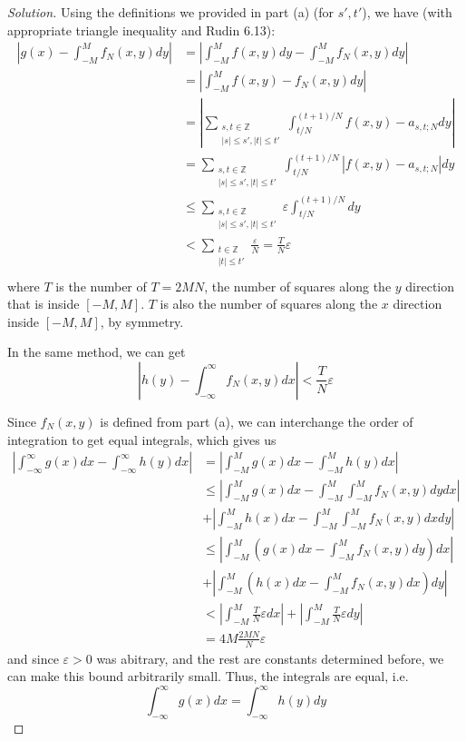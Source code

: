 \documentclass{article}
\newcommand{\Z}{{\mathbb Z}}
\newcommand{\ep}{{\varepsilon}}
\theoremstyle{remark}
\begin{document}
\begin{enumerate}
\begin{proof}[Solution]
		Using the definitions we provided in part (a) (for $s',t'$), we have
		(with appropriate triangle inequality and Rudin 6.13):
		\begin{align*}
			\left\lvert g(x) - \int_{-M}^M f_N(x,y)dy \right\rvert
			&= \left\lvert \int_{-M}^M f(x,y)dy - \int_{-M}^M f_N(x,y)dy \right\rvert\\
			&= \left\lvert \int_{-M}^M f(x,y) - f_N(x,y)dy \right\rvert\\
			&= \left\lvert
				\sum_{{\substack{s,t\in\Z\\|s|\leq s',|t|\leq t'}}} 
				\int_{t/N}^{(t+1)/N} f(x,y) - a_{s,t;N}dy
				\right\rvert\\
			&= \sum_{{\substack{s,t\in\Z\\|s|\leq s',|t|\leq t'}}}
			\int_{t/N}^{(t+1)/N} |f(x,y) - a_{s,t;N}|dy\\
			&\leq \sum_{{\substack{s,t\in\Z\\|s|\leq s',|t|\leq t'}}}
			\ep \int_{t/N}^{(t+1)/N}dy\\
			&< \sum_{{\substack{t\in\Z\\|t|\leq t'}}}
			\frac{\ep}{N} = \frac{T}{N}\ep\\
		\end{align*}
		where $T$ is the number of $T = 2MN$, the number of squares
		along the $y$ direction that is inside $[-M,M]$.
		$T$ is also the number of squares along the $x$ direction inside $[-M,M]$, by symmetry.
		
		In the same method, we can get
		\[
			\left\lvert h(y) - \int_{-\infty}^\infty f_N(x,y)dx \right\rvert
			< \frac{T}{N}\ep
		\]

		Since $f_N(x,y)$ is defined from part (a),
		we can interchange the order of integration to get equal integrals,
		which gives us
		\begin{align*}
			\left\lvert \int_{-\infty}^\infty g(x)dx - \int_{-\infty}^\infty h(y)dx \right\rvert
			&= \left\lvert \int_{-M}^M g(x)dx - \int_{-M}^M h(y)dx \right\rvert\\
			&\leq \left\lvert \int_{-M}^M g(x)dx -
				\int_{-M}^M \int_{-M}^M f_N(x,y) dydx \right\rvert\\
			&+ \left\lvert \int_{-M}^M h(x)dx -
				\int_{-M}^M \int_{-M}^M f_N(x,y) dxdy \right\rvert\\
			&\leq \left\lvert \int_{-M}^M \left(g(x)dx -
				\int_{-M}^M f_N(x,y) dy\right)dx \right\rvert\\
			&+ \left\lvert \int_{-M}^M \left(h(x)dx -
				\int_{-M}^M f_N(x,y) dx\right)dy \right\rvert\\
			&< \left\lvert\int_{-M}^M \frac{T}{N}\ep dx \right\rvert
			+ \left\lvert\int_{-M}^M \frac{T}{N}\ep dy \right\rvert\\
			&= 4M\frac{2MN}{N}\ep
		\end{align*}
		and since $\ep > 0$ was abitrary, and the rest are constants
		determined before, we can make this bound arbitrarily small.
		Thus, the integrals are equal, i.e.
		\[
			\int_{-\infty}^\infty g(x)dx = \int_{-\infty}^\infty h(y)dy
		\]
	\end{proof}
\end{enumerate}
\end{document}

